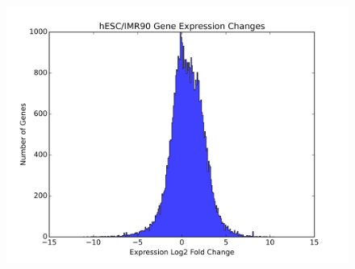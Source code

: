 \begin{figure}[H]
  \centering
  \includegraphics[width=\textwidth]{./figures/supplementary/genes/both.png}\label{fig:bothExpression}
\end{figure}


